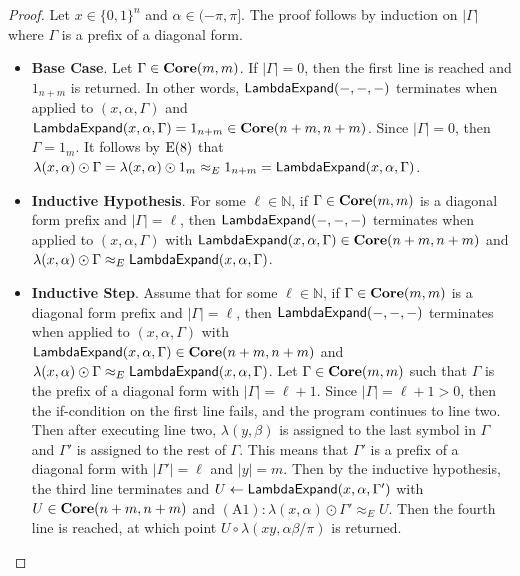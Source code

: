 \begin{proof}
    Let $x \in \{ 0, 1 \}^n$ and $\alpha \in (-\pi, \pi]$.
    The proof follows by induction on $|\Gamma|$ where $\Gamma$ is a prefix of a diagonal form.
    \begin{itemize}
    \item \textbf{Base Case}.
          Let $\Gamma \in \mathbf{Core}( m, m )$.
          If $|\Gamma| = 0$, then the first line is reached and $1_{n+m}$ is returned.
          In other words, $\mathsf{LambdaExpand}( -, -, - )$ terminates when applied to $( x, \alpha, \Gamma )$ and $\mathsf{LambdaExpand}( x, \alpha, \Gamma ) = 1_{n+m} \in \mathbf{Core}( n + m, n + m )$.
          Since $|\Gamma| = 0$, then $\Gamma = 1_m$.
          It follows by $\text{E(8)}$ that $\lambda( x, \alpha ) \odot \Gamma = \lambda( x, \alpha ) \odot 1_m \approx_E 1_{n+m} = \mathsf{LambdaExpand}( x, \alpha, \Gamma )$.
    \item \textbf{Inductive Hypothesis}.
          For some $\ell \in \mathbb{N}$, if $\Gamma \in \mathbf{Core}( m, m )$ is a diagonal form prefix and $|\Gamma| = \ell$, then $\mathsf{LambdaExpand}( -, -, - )$ terminates when applied to $( x, \alpha, \Gamma )$ with $\mathsf{LambdaExpand}( x, \alpha, \Gamma ) \in \mathbf{Core}( n + m, n + m )$ and $\lambda( x, \alpha ) \odot \Gamma \approx_E \mathsf{LambdaExpand}( x, \alpha, \Gamma )$.
    \item \textbf{Inductive Step}.
          Assume that for some $\ell \in \mathbb{N}$, if $\Gamma \in \mathbf{Core}( m, m )$ is a diagonal form prefix and $|\Gamma| = \ell$, then $\mathsf{LambdaExpand}( -, -, - )$ terminates when applied to $( x, \alpha, \Gamma )$ with $\mathsf{LambdaExpand}( x, \alpha, \Gamma ) \in \mathbf{Core}( n + m, n + m )$ and $\lambda( x, \alpha ) \odot \Gamma \approx_E \mathsf{LambdaExpand}( x, \alpha, \Gamma )$.
          Let $\Gamma \in \mathbf{Core}( m, m )$ such that $\Gamma$ is the prefix of a diagonal form with $|\Gamma| = \ell + 1$.
          Since $|\Gamma| = \ell + 1 > 0$, then the if-condition on the first line fails, and the program continues to line two.
          Then after executing line two, $\lambda( y, \beta )$ is assigned to the last symbol in $\Gamma$ and $\Gamma'$ is assigned to the rest of $\Gamma$.
          This means that $\Gamma'$ is a prefix of a diagonal form with $|\Gamma'| = \ell$ and $|y| = m$.
          Then by the inductive hypothesis, the third line terminates and $U \gets \mathsf{LambdaExpand}( x, \alpha, \Gamma' )$ with $U \in \mathbf{Core}( n + m, n + m )$ and $(\text{A1}): \lambda( x, \alpha ) \odot \Gamma' \approx_E U$.
          Then the fourth line is reached, at which point $U \circ \lambda( xy, \alpha\beta / \pi )$ is returned.

\end{itemize}
\end{proof}
